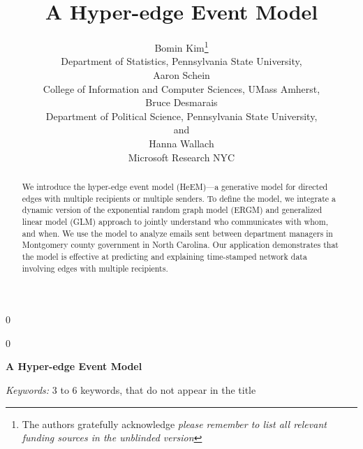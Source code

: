 \documentclass[12pt]{article}
\newcommand{\blind}{0}
\begin{document}
\def\spacingset#1{\renewcommand{\baselinestretch}%
{#1}\small\normalsize} \spacingset{1}



\blind
{
  \title{\bf A Hyper-edge Event Model}
  \author{Bomin Kim\thanks{
    The authors gratefully acknowledge \textit{please remember to list all relevant funding sources in the unblinded version}}\hspace{.2cm}\\
    Department of Statistics, Pennsylvania State University,\\
  Aaron Schein\\
  College of Information and Computer Sciences, UMass Amherst,\\
    Bruce Desmarais\\
    Department of Political Science, Pennsylvania State University,\\
    and\\
    Hanna Wallach\\
    Microsoft Research NYC}
  \maketitle
} \fi
{}\blind
{
  \bigskip
  \bigskip
  \bigskip
  \begin{center}
    {\LARGE\bf A Hyper-edge Event Model}
\end{center}
  \medskip
} \fi

\bigskip
\begin{abstract}
We introduce the hyper-edge event model (HeEM)---a generative model for directed edges with multiple recipients or multiple senders. To define the model, we
integrate a dynamic version of the exponential random graph model (ERGM) and generalized linear model (GLM) approach to jointly understand who communicates with whom, and when. We use the model to analyze emails sent between department managers in Montgomery county government in North Carolina. Our application demonstrates that the model is effective at predicting and explaining time-stamped network data involving edges with multiple recipients.
	\end{abstract}

\noindent%
{\it Keywords:}  3 to 6 keywords, that do not appear in the title
\vfill

\newpage
\spacingset{1.45} %
\end{document}
